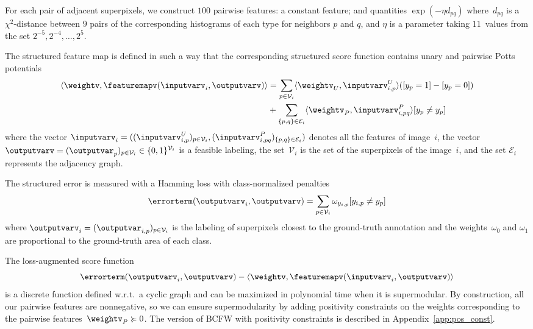 \documentclass{article}
\begin{document}
%
%
%

For each pair of adjacent superpixels, we construct $100$ pairwise features: a constant feature; and
quantities $\exp{(-\eta d_{pq})}$ where~$d_{pq}$ is a $\chi^2$-distance between $9$ pairs of the corresponding histograms of each type for neighbors $p$ and $q$, and $\eta$ is a parameter taking $11$~values from the set $2^{-5}, 2^{-4}, \dots, 2^5$.

The structured feature map is defined in such a way that the corresponding structured score function contains unary and pairwise Potts potentials\\[-4mm]
\begin{align*}
\langle \weightv, \featuremapv(\inputvarv_i,\outputvarv) \rangle
&=
\sum_{p \in \mathcal{V}_i} \langle \weightv_U, \inputvarv_{i, p}^U \rangle ([y_p = 1] - [y_p=0]) \\
&+
\sum_{\{p,q\} \in \mathcal{E}_i} \langle \weightv_P,\inputvarv_{i, pq}^P \rangle [y_p \neq y_p]
\end{align*}
where the vector $\inputvarv_i = ( (\inputvarv_{i, p}^U)_{p\in\mathcal{V}_i}, (\inputvarv_{i, pq}^P)_{\{p,q\} \in \mathcal{E}_i})$ denotes all the features of image~$i$, the vector~$\outputvarv = (\outputvar_p)_{p\in \mathcal{V}_i} \in \{0,1\}^{\mathcal{V}_i}$ is a feasible labeling, the set~$\mathcal{V}_i$ is the set of the superpixels of the image~$i$, and the set $\mathcal{E}_i$ represents the adjacency graph.

The structured error is measured with a Hamming loss with class-normalized penalties 
\begin{equation*}
\errorterm(\outputvarv_i,\outputvarv)
=
\sum_{p \in \mathcal{V}_i} \omega_{y_{i,p}} [y_{i,p} \neq y_{p}]
\end{equation*}
where $\outputvarv_i = (\outputvar_{i,p})_{p\in \mathcal{V}_i}$ is the labeling of superpixels closest to the ground-truth annotation and the weights~$\omega_{0}$ and $\omega_{1}$ are proportional to the ground-truth area of each class.

The loss-augmented score function
$$
\errorterm(\outputvarv_i,\outputvarv) - \langle \weightv, \featuremapv(\inputvarv_i,\outputvarv)\rangle
$$
is a discrete function defined w.r.t.\ a cyclic graph and can be maximized in polynomial time when it is supermodular. By construction, all our pairwise features are nonnegative, so we can ensure supermodularity by adding positivity constraints on the weights corresponding to the pairwise features~$\weightv_P \succcurlyeq 0$. 
The version of BCFW with positivity constraints is described in Appendix~\ref{app:pos_const}.
\end{document}
